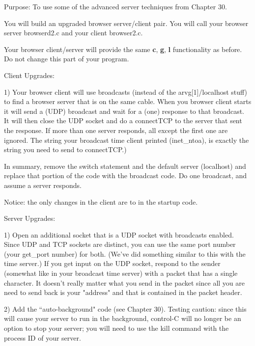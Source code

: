 

\parindent 0pt

Purpose: To use some of the advanced server techniques from
Chapter 30.

You will build an upgraded browser server/client pair.
You will call your browser server {\ltt{}browserd2.c}
and your client {\ltt{}browser2.c}.

Your browser client/server will provide the same {\bf c}, {\bf g},
{\bf l} functionality as before.
Do not change this part of your program.

Client Upgrades:

1) Your browser client will use broadcasts (instead of the
{\ltt{}arvg[1]}/{\ltt{}localhost} stuff) to find a browser
server that is on the same cable.
When you browser client starts it will send a (UDP) broadcast and
wait for a (one) response to that broadcast. It will then close
the UDP socket and do a {\ltt{}connectTCP} to the server that
sent the response. If more than one server responds, all except
the first one are ignored.
The string your broadcast time client printed ({\ltt{}inet_ntoa}),
is exactly the string you need to send to {\ltt{}connectTCP}.)

In summary, remove the switch statement and the default
server ({\ltt{}localhost}) and replace that portion of the code
with the broadcast code.
Do one broadcast, and assume a server responds.

Notice: the only changes in the client are to in the startup code.

Server Upgrades:

1) Open an additional socket that is a UDP socket with broadcasts enabled.
Since UDP and TCP sockets are distinct, you can use the same port number
(your {\ltt{}get_port} number) for both.
(We've did something similar to this with the time server.)
If you get input on the UDP socket, respond to the sender (somewhat like in your
broadcast time server) with a packet that has a single character.
It doesn't really matter what you send in the packet
since all you are need to send back is your "address" and
that is contained in the packet header.


2) Add the ``auto-background" code (see Chapter 30).
Testing caution: since this will cause your server to run in the background,
control-C will no longer be an option to stop your server; you will
need to use the {\ltt{}kill} command with the process ID of your server.

